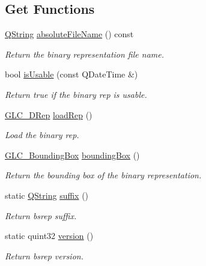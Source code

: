 \subsection*{Get Functions}
\begin{DoxyCompactItemize}
\item 
\hyperlink{group___u_a_v_objects_plugin_gab9d252f49c333c94a72f97ce3105a32d}{Q\-String} \hyperlink{class_g_l_c___b_s_rep_a6383f6a2c3379ba7b1c49fae46c14881}{absolute\-File\-Name} () const 
\begin{DoxyCompactList}\small\item\em Return the binary representation file name. \end{DoxyCompactList}\item 
bool \hyperlink{class_g_l_c___b_s_rep_a15e3cab93a624d393d13cbdf8cae2e5b}{is\-Usable} (const Q\-Date\-Time \&)
\begin{DoxyCompactList}\small\item\em Return true if the binary rep is usable. \end{DoxyCompactList}\item 
\hyperlink{class_g_l_c__3_d_rep}{G\-L\-C\-\_\-D\-Rep} \hyperlink{class_g_l_c___b_s_rep_ac4c5d01547100d3582894fc157483b28}{load\-Rep} ()
\begin{DoxyCompactList}\small\item\em Load the binary rep. \end{DoxyCompactList}\item 
\hyperlink{class_g_l_c___bounding_box}{G\-L\-C\-\_\-\-Bounding\-Box} \hyperlink{class_g_l_c___b_s_rep_ac302a97d991eefe235b939348fe8fc29}{bounding\-Box} ()
\begin{DoxyCompactList}\small\item\em Return the bounding box of the binary representation. \end{DoxyCompactList}\item 
static \hyperlink{group___u_a_v_objects_plugin_gab9d252f49c333c94a72f97ce3105a32d}{Q\-String} \hyperlink{class_g_l_c___b_s_rep_a4146efee65a2a82a7593bea22cf8b03d}{suffix} ()
\begin{DoxyCompactList}\small\item\em Return bsrep suffix. \end{DoxyCompactList}\item 
static quint32 \hyperlink{class_g_l_c___b_s_rep_a57dae5849a469d8c69fd1f7fe8d26bec}{version} ()
\begin{DoxyCompactList}\small\item\em Return bsrep version. \end{DoxyCompactList}\end{DoxyCompactItemize}


